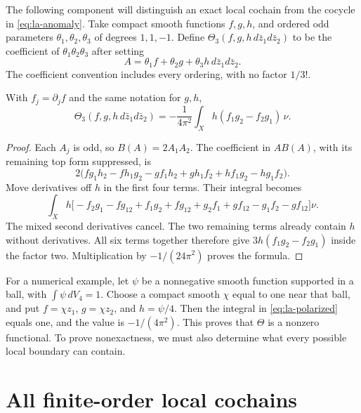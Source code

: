 The following component will distinguish an exact local cochain
from the cocycle in \eqref{eq:la-anomaly}. Take compact smooth
functions $f,g,h$, and ordered odd parameters
$\theta_1,\theta_2,\theta_3$ of degrees $1,1,-1$.
Define $\Theta_3(f,g,h\,d\bar z_1d\bar z_2)$ to be the coefficient
of $\theta_1\theta_2\theta_3$ after setting
\[
 A=\theta_1f+\theta_2g
          +\theta_3h\,d\bar z_1d\bar z_2.
\]
The coefficient convention includes every ordering, with no
factor $1/3!$.

\begin{lemma}\label{lem:la-polarization}
With $f_j=\partial_jf$ and the same notation for $g,h$,
\begin{equation}\label{eq:la-polarized}
 \Theta_3(f,g,h\,d\bar z_1d\bar z_2)
 =-\frac1{4\pi^2}
       \int_X h(f_1g_2-f_2g_1)\,\nu.
\end{equation}
\end{lemma}
\begin{proof}
Each $A_j$ is odd, so $B(A)=2A_1A_2$. The coefficient in
$A B(A)$, with its remaining top form suppressed, is
\[
 2\bigl(fg_1h_2-fh_1g_2-gf_1h_2
          +gh_1f_2+hf_1g_2-hg_1f_2\bigr).
\]
Move derivatives off $h$ in the first four terms. Their integral
becomes
\[
 \int_X h\bigl[-f_2g_1-fg_{12}+f_1g_2+fg_{12}
             +g_2f_1+gf_{12}-g_1f_2-gf_{12}\bigr]\nu.
\]
The mixed second derivatives cancel. The two remaining terms
already contain $h$ without derivatives. All six terms together
therefore give $3h(f_1g_2-f_2g_1)$ inside the factor two.
Multiplication by $-1/(24\pi^2)$ proves the formula.
\end{proof}

For a numerical example, let $\psi$ be a nonnegative smooth
function supported in a ball, with $\int\psi\,dV_4=1$.
Choose a compact smooth $\chi$ equal to one near that ball, and
put $f=\chi z_1$, $g=\chi z_2$, and $h=\psi/4$.
Then the integral in \eqref{eq:la-polarized} equals one, and the
value is $-1/(4\pi^2)$. This proves that $\Theta$ is a nonzero
functional. To prove nonexactness, we must also determine what
every possible local boundary can contain.

\section{All finite-order local cochains}
\label{sec:la-jets}

